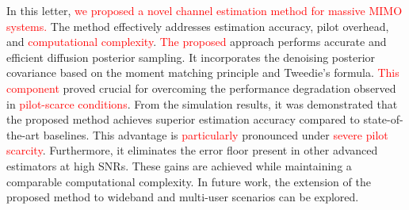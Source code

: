 \documentclass[lettersize,journal]{IEEEtran}
\newcommand{\tred}{\textcolor{red}}
\begin{document}
In this letter, \tred{we proposed a novel channel estimation method for massive MIMO systems.} The method effectively addresses estimation accuracy, pilot overhead, and \tred{computational complexity}. \tred{The proposed} approach performs accurate and efficient diffusion posterior sampling. It incorporates the denoising posterior covariance based on the moment matching principle and Tweedie's formula. \tred{This component} proved crucial for overcoming the performance degradation observed in \tred{pilot-scarce conditions}. From the simulation results, it was demonstrated that the proposed method achieves superior estimation accuracy compared to state-of-the-art baselines. This advantage is \tred{particularly} pronounced under \tred{severe pilot scarcity}. Furthermore, it eliminates the error floor present in other advanced estimators at high SNRs. These gains are achieved while maintaining a comparable computational complexity. In future work, the extension of the proposed method to wideband and multi-user scenarios can be explored.

% 

\end{document}
